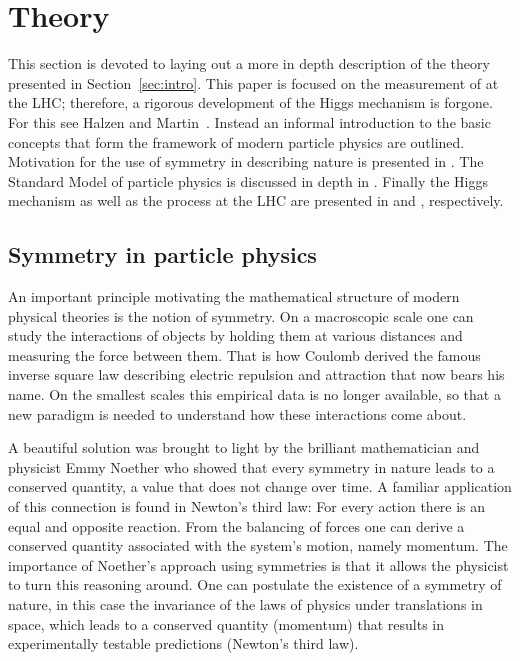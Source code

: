 \section{Theory}
\label{sec:theory}

This section is devoted to laying out a more in depth description of the
theory presented in Section~\ref{sec:intro}. This paper is focused on the
measurement of \HToZg at the LHC; therefore, a rigorous development of
the Higgs mechanism is forgone. For this see Halzen and Martin~\cite{QuarksLeptons}.
Instead an informal introduction to the basic concepts that form
the framework of modern particle physics are outlined. 
Motivation for the use of symmetry in describing nature is presented in 
. The Standard Model of particle physics is discussed
in depth in . Finally the Higgs mechanism as well
as the \HToZg process at the LHC are presented in  and 
, respectively.

\subsection{Symmetry in particle physics}
\label{subsec:symmetry}

An important principle motivating the mathematical structure of modern physical 
theories is the notion of symmetry. On a macroscopic scale one can study
the interactions of objects by holding them at various
distances and measuring the force between them. That is how Coulomb derived
the famous inverse square law describing electric repulsion and attraction that
now bears his name. On the smallest scales this empirical data is no longer
available, so that a new paradigm is needed to understand how these interactions
come about. 

A beautiful solution was brought to light by the brilliant 
mathematician and physicist Emmy Noether who showed that every symmetry in
nature leads to a conserved quantity, a value that does not change over time.
A familiar application of this connection is found in Newton's third law:
For every action there is an equal and opposite reaction. From the balancing of
forces one can derive a conserved quantity associated with the system's 
motion, namely momentum. The importance of Noether's approach using symmetries
is that it allows the physicist to turn this reasoning around. One can postulate
the existence of a symmetry of nature, in this case the invariance of the laws
of physics under translations in space, which leads to a conserved quantity (momentum)
that results in experimentally testable predictions (Newton's third law).

